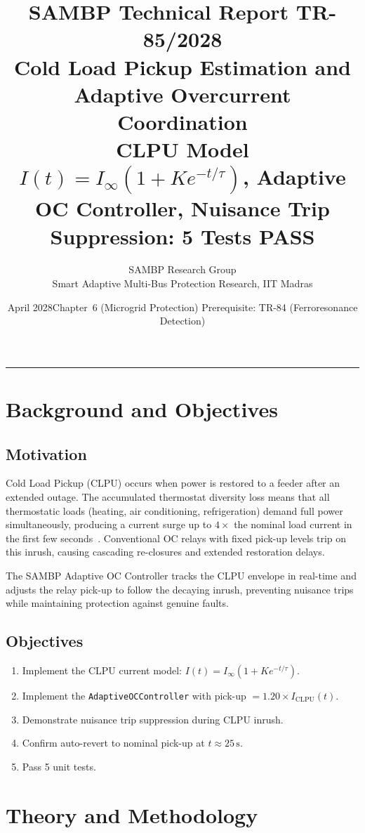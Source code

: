 \documentclass[11pt, a4paper]{article}
\title{\textbf{\textsf{\color{sambpblue}SAMBP Technical Report TR-85/2028}}\\[6pt]
  \Large Cold Load Pickup Estimation and Adaptive Overcurrent Coordination\\[4pt]
  \normalsize CLPU Model $I(t) = I_\infty(1 + Ke^{-t/\tau})$,
  Adaptive OC Controller, Nuisance Trip Suppression: 5 Tests PASS}
\author{SAMBP Research Group\\[2pt]
  \small Smart Adaptive Multi-Bus Protection Research, IIT Madras}
\date{April 2028\quad\textbar\quad Chapter~6 (Microgrid Protection)\quad\textbar\quad
  Prerequisite: TR-84 (Ferroresonance Detection)}
\begin{document}
\maketitle
\tableofcontents
\vspace{6pt}\hrule\vspace{10pt}

\section{Background and Objectives}
\label{sec:background}

\subsection{Motivation}

Cold Load Pickup (CLPU) occurs when power is restored to a feeder after
an extended outage. The accumulated thermostat diversity loss means that
all thermostatic loads (heating, air conditioning, refrigeration) demand
full power simultaneously, producing a current surge up to $4\times$
the nominal load current in the first few seconds~\cite{Ihara1981}.
Conventional OC relays with fixed pick-up levels trip on this inrush,
causing cascading re-closures and extended restoration delays.

The SAMBP Adaptive OC Controller tracks the CLPU envelope in real-time
and adjusts the relay pick-up to follow the decaying inrush, preventing
nuisance trips while maintaining protection against genuine faults.

\subsection{Objectives}

\begin{enumerate}
  \item Implement the CLPU current model: $I(t) = I_\infty(1 + Ke^{-t/\tau})$.
  \item Implement the \texttt{AdaptiveOCController} with pick-up $= 1.20
    \times I_{\mathrm{CLPU}}(t)$.
  \item Demonstrate nuisance trip suppression during CLPU inrush.
  \item Confirm auto-revert to nominal pick-up at $t \approx 25\,\text{s}$.
  \item Pass 5 unit tests.
\end{enumerate}

\section{Theory and Methodology}
\label{sec:theory}
\end{document}
